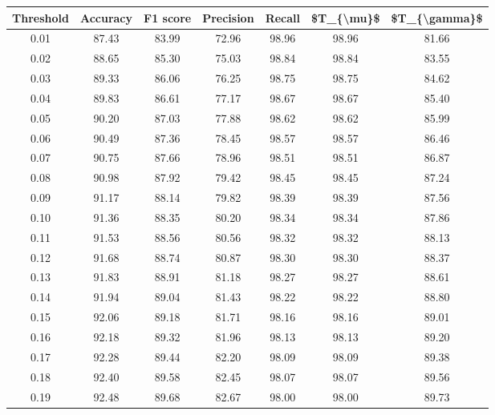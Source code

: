 \begin{tabular}{|c|c|c|c|c|c|c|}
\hline
 Threshold &  Accuracy &  F1 score &  Precision &  Recall &  \$T\_\{\textbackslash mu\}\$ &  \$T\_\{\textbackslash gamma\}\$ \\
\hline
      0.01 &     87.43 &     83.99 &      72.96 &   98.96 &      98.96 &         81.66 \\
      0.02 &     88.65 &     85.30 &      75.03 &   98.84 &      98.84 &         83.55 \\
      0.03 &     89.33 &     86.06 &      76.25 &   98.75 &      98.75 &         84.62 \\
      0.04 &     89.83 &     86.61 &      77.17 &   98.67 &      98.67 &         85.40 \\
      0.05 &     90.20 &     87.03 &      77.88 &   98.62 &      98.62 &         85.99 \\
      0.06 &     90.49 &     87.36 &      78.45 &   98.57 &      98.57 &         86.46 \\
      0.07 &     90.75 &     87.66 &      78.96 &   98.51 &      98.51 &         86.87 \\
      0.08 &     90.98 &     87.92 &      79.42 &   98.45 &      98.45 &         87.24 \\
      0.09 &     91.17 &     88.14 &      79.82 &   98.39 &      98.39 &         87.56 \\
      0.10 &     91.36 &     88.35 &      80.20 &   98.34 &      98.34 &         87.86 \\
      0.11 &     91.53 &     88.56 &      80.56 &   98.32 &      98.32 &         88.13 \\
      0.12 &     91.68 &     88.74 &      80.87 &   98.30 &      98.30 &         88.37 \\
      0.13 &     91.83 &     88.91 &      81.18 &   98.27 &      98.27 &         88.61 \\
      0.14 &     91.94 &     89.04 &      81.43 &   98.22 &      98.22 &         88.80 \\
      0.15 &     92.06 &     89.18 &      81.71 &   98.16 &      98.16 &         89.01 \\
      0.16 &     92.18 &     89.32 &      81.96 &   98.13 &      98.13 &         89.20 \\
      0.17 &     92.28 &     89.44 &      82.20 &   98.09 &      98.09 &         89.38 \\
      0.18 &     92.40 &     89.58 &      82.45 &   98.07 &      98.07 &         89.56 \\
      0.19 &     92.48 &     89.68 &      82.67 &   98.00 &      98.00 &         89.73 \\

\end{tabular}
